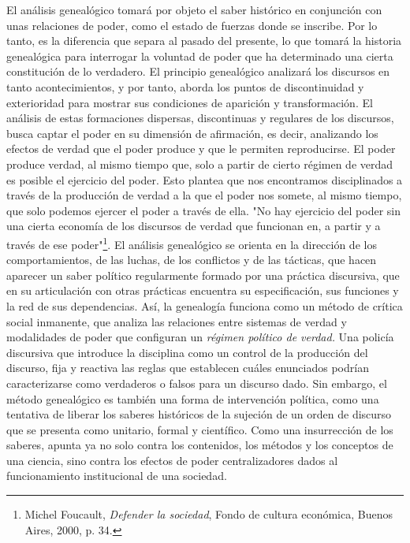 El análisis genealógico tomará por objeto el saber histórico en
conjunción con unas relaciones de poder, como el estado de fuerzas donde
se inscribe. Por lo tanto, es la diferencia que separa al pasado del
presente, lo que tomará la historia genealógica para interrogar la
voluntad de poder que ha determinado una cierta constitución de lo
verdadero. El principio genealógico analizará los discursos en tanto
acontecimientos, y por tanto, aborda los puntos de discontinuidad y
exterioridad para mostrar sus condiciones de aparición y transformación.
El análisis de estas formaciones dispersas, discontinuas y regulares de
los discursos, busca captar el poder en su dimensión de afirmación, es
decir, analizando los efectos de verdad que el poder produce y que le
permiten reproducirse. El poder produce verdad, al mismo tiempo que,
solo a partir de cierto régimen de verdad es posible el ejercicio del
poder. Esto plantea que nos encontramos disciplinados a través de la
producción de verdad a la que el poder nos somete, al mismo tiempo, que
solo podemos ejercer el poder a través de ella. "No hay ejercicio del
poder sin una cierta economía de los discursos de verdad que funcionan
en, a partir y a través de ese poder"\footnote{Michel Foucault,
  \emph{Defender la sociedad}, Fondo de cultura económica, Buenos Aires,
  2000, p. 34.}. El análisis genealógico se orienta en la dirección de
los comportamientos, de las luchas, de los conflictos y de las tácticas,
que hacen aparecer un saber político regularmente formado por una
práctica discursiva, que en su articulación con otras prácticas
encuentra su especificación, sus funciones y la red de sus dependencias.
Así, la genealogía funciona como un método de crítica social inmanente,
que analiza las relaciones entre sistemas de verdad y modalidades de
poder que configuran un \emph{régimen político de verdad.} Una policía
discursiva que introduce la disciplina como un control de la producción
del discurso, fija y reactiva las reglas que establecen cuáles
enunciados podrían caracterizarse como verdaderos o falsos para un
discurso dado. Sin embargo, el método genealógico es también una forma
de intervención política, como una tentativa de liberar los saberes
históricos de la sujeción de un orden de discurso que se presenta como
unitario, formal y científico. Como una insurrección de los saberes,
apunta ya no solo contra los contenidos, los métodos y los conceptos de
una ciencia, sino contra los efectos de poder centralizadores dados al
funcionamiento institucional de una sociedad.


